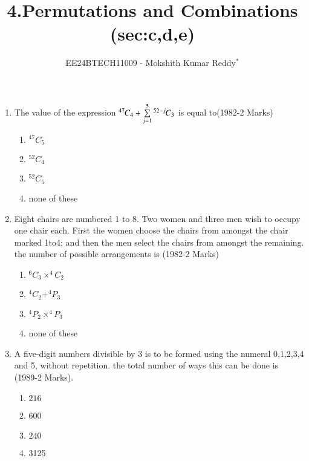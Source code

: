 \documentclass[journal,12pt,twocolumn]{IEEEtran}
\theoremstyle{remark}
\begin{document}

\vspace{3cm}

\title{4.Permutations and Combinations (sec:c,d,e)}
\author{EE24BTECH11009 - Mokshith Kumar Reddy$^{*}$%
}
\maketitle
\newpage
\bigskip
\begin{enumerate}[start=3]
\item  The value of the expression ${{}^{47}\mkern-1muC_{4}}+\sum\limits_{j=1}^{5} {{}^{52-j}\mkern-1muC_{3}}$ is equal to\hfill{(1982-2 Marks)}\\
\begin{multicols}{2} 
\begin{enumerate}
\item $^{47}C_5$
\item$^{52}C_4$
\columnbreak
\item $^{52}C_5$
\item none of these\\
\end{enumerate}
\end{multicols}
\item Eight chairs are numbered 1 to 8. Two women and three men wish to occupy one chair each. First the women choose the chairs from amongst the chair marked 1to4; and then the men select the chairs from amongst the remaining. the number of possible arrangements is
\hfill{(1982-2 Marks)}\\
\begin{multicols}{2} 
\begin{enumerate}
\item $^6C_3\times^4C_2$
\item $^4C_2+^4P_3$\columnbreak
\item $^4P_2\times^4P_3$
\item none of these\\[4pt]
\end{enumerate}
\end{multicols}
\item A five-digit numbers divisible by 3 is to be formed using the numeral 0,1,2,3,4 and 5, without repetition. the total number of ways this can be done is\\
\hspace*{\fill}(1989-2 Marks).
\begin{multicols}{2} 
\begin{enumerate}
\item $216$\item  600\columnbreak\item $240$\item 3125\\[4pt]

\end{enumerate}
\end{multicols}
\end{enumerate}
\end{document}
